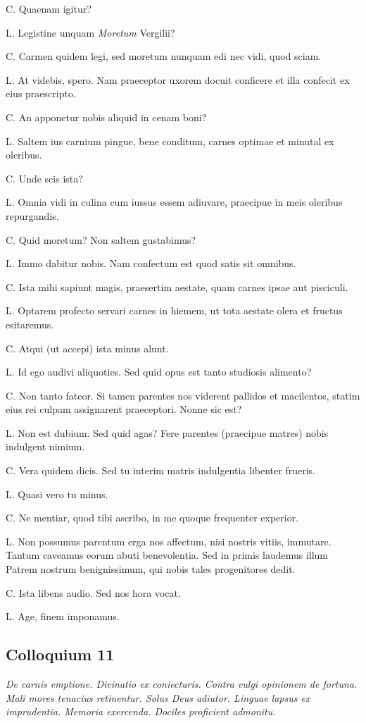\documentclass{article}
\begin{document}
C. Quaenam igitur?

L. Legistine unquam \emph{Moretum} Vergilii?

C. Carmen quidem legi, sed moretum nunquam edi nec vidi, quod sciam.

L. At videbis, spero. Nam praeceptor uxorem docuit conficere et illa confecit ex eius praescripto.

C. An apponetur nobis aliquid in cenam boni?

L. Saltem ius carnium pingue, bene conditum, carnes optimae et minutal ex oleribus.

C. Unde scis ista?

L. Omnia vidi in culina cum iussus essem adiuvare, praecipue in meis oleribus repurgandis.

C. Quid moretum? Non saltem gustabimus?

L. Immo dabitur nobis. Nam confectum est quod satis sit omnibus.

C. Ista mihi sapiunt magis, praesertim aestate, quam carnes ipsae aut pisciculi.

L. Optarem profecto servari carnes in hiemem, ut tota aestate olera et fructus esitaremus.

C. Atqui (ut accepi) ista minus alunt.

L. Id ego audivi aliquoties. Sed quid opus est tanto studiosis alimento?

C. Non tanto fateor. Si tamen parentes nos viderent pallidos et macilentos, statim eius rei culpam assignarent praeceptori. Nonne sic est?

L. Non est dubium. Sed quid agas? Fere parentes (praecipue matres) nobis indulgent nimium.

C. Vera quidem dicis. Sed tu interim matris indulgentia libenter frueris.

L. Quasi vero tu minus.

C. Ne mentiar, quod tibi ascribo, in me quoque frequenter experior.

L. Non possumus parentum erga nos affectum, nisi nostris vitiis, immutare. Tantum caveamus eorum abuti benevolentia. Sed in primis laudemus illum Patrem nostrum benignissimum, qui nobis tales progenitores dedit.

C. Ista libens audio. Sed nos hora vocat.

L. Age, finem imponamus.

\subsection{Colloquium 11}
\emph{De carnis emptione. Divinatio ex coniecturis. Contra vulgi opinionem de fortuna. Mali mores tenacius retinentur. Solus Deus adiutor. Linguae lapsus ex imprudentia. Memoria exercenda. Dociles proficient admonitu.}
\end{document}
